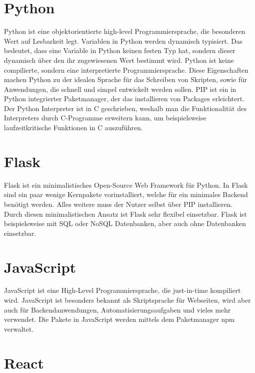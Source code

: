 \section{Python}
\label{sec:python}

Python ist eine objektorientierte high-level Programmiersprache, die besonderen Wert auf Lesbarkeit legt.
Variablen in Python werden dynamisch typisiert.
Das bedeutet, dass eine Variable in Python keinen festen Typ hat, sondern dieser dynamisch über den ihr zugewiesenen Wert bestimmt wird.
Python ist keine compilierte, sondern eine interpretierte Programmiersprache.
Diese Eigenschaften machen Python zu der idealen Sprache für das Schreiben von Skripten, sowie für Anwendungen, die schnell und simpel entwickelt werden sollen.
PIP ist ein in Python integrierter Paketmanager, der das installieren von Packages erleichtert.
Der Python Interpreter ist in C geschrieben, weshalb man die Funktionalität des Interpreters durch C-Programme erweitern kann, um beispielsweise laufzeitkritische Funktionen in C auszuführen.
~\autocite{van:python}

\section{Flask}
\label{sec:flask}

Flask ist ein minimalistisches Open-Source Web Framework für Python.
In Flask sind ein paar wenige Kernpakete vorinstalliert, welche für ein minimales Backend benötigt werden.
Alles weitere muss der Nutzer selbst über PIP installieren.
~\autocite{grindberg:flask}
Durch diesen minimalistischen Ansatz ist Flask sehr flexibel einsetzbar.
Flask ist beispielsweise mit SQL oder NoSQL Datenbanken, aber auch ohne Datenbanken einsetzbar.


\section{JavaScript}
\label{sec:js}

JavaScript ist eine High-Level Programmiersprache, die just-in-time kompiliert wird.
JavaScript ist besonders bekannt als Skriptsprache für Webseiten, wird aber auch für Backendanwendungen, Automatisierungsaufgaben und vieles mehr verwendet.
Die Pakete in JavaScript werden mittels dem Paketmanager npm verwaltet.

\section{React}
\label{sec:react}


